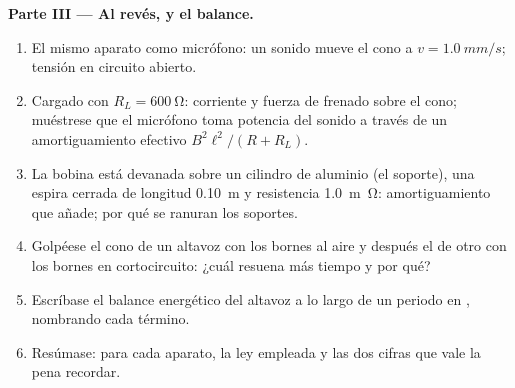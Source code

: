 \begin{problem}
\medskip
\noindent\textbf{Parte III --- Al revés, y el balance.}
\begin{enumerate}[resume]
  \item El mismo aparato como micrófono: un sonido mueve el cono a
        $v = \qty{1.0}{mm/s}$; tensión en circuito abierto.
  \item Cargado con $R_L = \qty{600}{\ohm}$: corriente y fuerza de frenado
        sobre el cono; muéstrese que el micrófono toma potencia del sonido
        a través de un amortiguamiento efectivo $B^2\ell^2/(R + R_L)$.
  \item La bobina está devanada sobre un cilindro de aluminio (el
        soporte), una espira cerrada de longitud \qty{0.10}{m} y
        resistencia \qty{1.0}{m\ohm}: amortiguamiento que añade; por qué se
        ranuran los soportes.
  \item Golpéese el cono de un altavoz con los bornes al aire y después el
        de otro con los bornes en cortocircuito: ¿cuál resuena más tiempo
        y por qué?
  \item Escríbase el balance energético del altavoz a lo largo de un
        periodo en , nombrando cada término.
  \item Resúmase: para cada aparato, la ley empleada y las dos cifras que
        vale la pena recordar.
\end{enumerate}
\end{problem}
